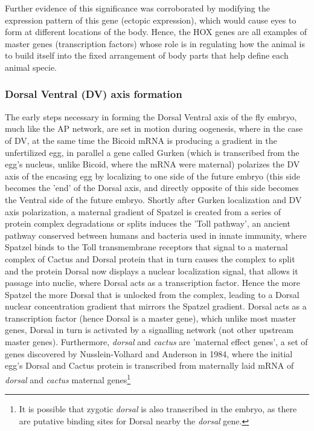 Further evidence of this significance was corroborated by modifying the expression pattern of this gene (ectopic expression), which would cause eyes to form at different locations of the body\cite{pmid10461206}.  Hence, the HOX genes are all examples of master genes (transcription factors) whose role is in regulating how the animal is to build itself into the fixed arrangement of body parts that help define each animal specie. 

\subsubsection*{Dorsal Ventral (DV) axis formation}
The early steps necessary in forming the Dorsal Ventral axis of the fly embryo, much like the AP network, are set in motion during oogenesis, where in the case of DV, at the same time the Bicoid mRNA is producing a gradient in the unfertilized egg, in parallel a gene called Gurken (which is transcribed from the egg's nucleus, unlike Bicoid, where the mRNA were maternal) polarizes the DV axis of the encasing egg by localizing to one side of the future embryo (this side becomes the 'end' of the Dorsal axis, and directly opposite of this side becomes the Ventral side of the future embryo.  Shortly after Gurken localization and DV axis polarization, a maternal gradient of Spatzel is created from a series of protein complex degradations or splits induces the 'Toll pathway', an ancient pathway conserved between humans and bacteria used in innate immunity, where Spatzel binds to the Toll transmembrane receptors that signal to a maternal complex of Cactus and Dorsal protein that in turn causes the complex to split and the protein Dorsal now displays a nuclear localization signal, that allows it passage into nuclie, where Dorsal acts as a transcription factor.  Hence the more Spatzel the more Dorsal that is unlocked from the complex, leading to a Dorsal nuclear concentration gradient that mirrors the Spatzel gradient. Dorsal acts as a transcription factor (hence Dorsal is a master gene), which unlike most master genes, Dorsal in turn is activated by a signalling network (not other upstream master genes).  Furthermore, \textit{dorsal} and \textit{cactus} are 'maternal effect genes', a set of genes discovered by Nusslein-Volhard and Anderson in 1984, where the initial egg's Dorsal and Cactus protein is transcribed from maternally laid mRNA of \textit{dorsal} and \textit{cactus} maternal genes\footnote{It is possible that zygotic \textit{dorsal} is also transcribed in the embryo, as there are putative binding sites for Dorsal nearby the \textit{dorsal} gene.}

